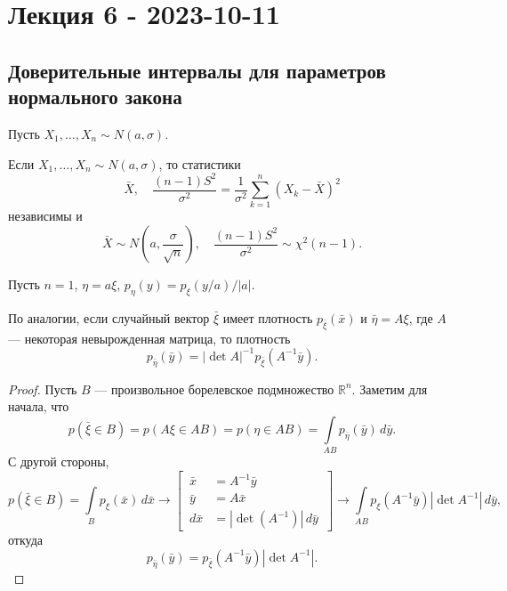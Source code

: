 \chapter{Лекция 6 - 2023-10-11}
\section{Доверительные интервалы для параметров нормального закона}
Пусть $X_1, \dots, X_n \sim N(a, \sigma)$.

\begin{theorem}
	\label{the:1}
  Если $X_1, \dots, X_n \sim N(a, \sigma)$, то статистики
\[
	\bar X,\quad \frac{(n-1) S^2}{\sigma^2} = \frac{1}{\sigma^2} \sum\limits_{k=1}^n (X_k-\bar X)^2
\]
	независимы и
	\[
		\bar X \sim N\left(a, \frac{\sigma}{\sqrt{n}}\right),\quad \frac{(n-1)
		S^2}{\sigma^2} \sim \chi^2(n-1).
	\]
\end{theorem}

  Пусть $n = 1$, $\eta = a \xi$, $p_\eta(y) = p_\xi(y/a)/|a| $.
\begin{lemma}
  По аналогии, если случайный вектор $ \bar \xi $ имеет плотность $p_{\bar \xi}
	(\bar x)$ и $\bar\eta = A\xi$, где $ A $ --- некоторая невырожденная матрица, то 
	плотность
	\[
		p_{\bar\eta} (\bar y) = |\det A|^{-1} p_{\bar\xi} (A^{-1} \bar y).
	\]
\end{lemma}
\begin{proof}
	Пусть $ B $ --- произвольное борелевское подмножество $ \mathbb R^n $. Заметим
	для начала, что
  \[
		p(\bar\xi \in B) = p(A\xi \in AB) = p(\eta \in AB) = \int\limits_{AB}
		p_{\bar\eta}(\bar y)\,d\bar y.
	\]
	С другой стороны,
  \[ 
		p(\bar \xi \in B) = \int\limits_B p_\xi (\bar x) \, d\bar x
  \to \left[\, \begin{aligned}
    \bar x &= A^{-1} \bar y \\
    \bar y &= A \bar x \\
    d\bar x &= |\det(A^{-1})| \,d\bar y
\end{aligned} \,\right] \to 
  \int\limits_{AB} p_\xi(A^{-1} \bar y) |\det A^{-1}|\, d\bar y ,
\]
откуда  
\[
		p_{\bar \eta} (\bar y)
  = p_{\bar\xi} (A^{-1} \bar y) |\det A^{-1}|.
\]

\end{proof}


